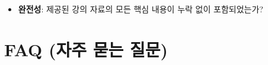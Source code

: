 \documentclass[11pt,a4paper]{article}
\begin{document}
\begin{tcolorbox}[title=\textbf{학습/작성/검토 체크리스트}, colback=myblue!10, colframe=blue!75!black, boxrule=0.8pt, arc=4pt]
\begin{itemize}
\begin{itemize}
        \item 모를 수 있는 포인트를 예측하여 미리 설명되었는가?
        \item 문맥 의존 표현 없이 문장 자체로 의미가 통하는가?
        \item 개념 간 비교표(필요시)가 추가되었는가?
    \end{itemize}
    \item \textbf{완전성}: 제공된 강의 자료의 모든 핵심 내용이 누락 없이 포함되었는가?
\end{itemize}
\end{tcolorbox}

\newpage
\section*{FAQ (자주 묻는 질문)}
\end{document}
